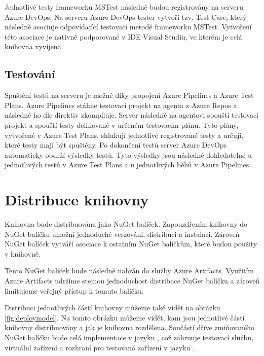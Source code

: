 Jednotlivé testy frameworku MSTest následně budou registrovány na serveru Azure DevOps. Na serveru Azure DevOps tester vytvoří tzv. Test Case, který následně asociuje odpovídající testovací metodě frameworku MSTest. Vytvoření této asociace je nativně podporované v IDE Visual Studiu, ve kterém je celá knihovna vyvíjena. 


\subsection{Testování}
Spuštění testů na serveru je možné díky propojení Azure Pipelines a Azure Test Plans. Azure Pipelines stáhne testovací projekt na agenta z Azure Repos a následně ho dle direktiv zkompiluje. Server následně na agentovi spouští testovací projekt a spouští testy definované v určeném testovacím plánu. Tyto plány, vytvořené v Azure Test Plans, shlukují jednotlivé registrované testy a určují, které testy mají být spuštěny. Po dokončení testů server Azure DevOps automaticky obdrží výsledky testů. Tyto výsledky jsou následně dohledatelné u jednotlivých testů v Azure Test Plans a u jednotlivých běhů v Azure Pipelines. 


\section{Distribuce knihovny}

Knihovna bude distribuována jako NuGet balíček. Zapouzdřením knihovny do NuGet balíčku umožní jednoduché verzování, distribuci a instalaci. Zároveň NuGet balíček vytváří asociace k ostatním NuGet balíčkům, které budou použity v knihovně.

Tento NuGet balíček bude následně nahrán do služby Azure Artifacts. Využitím Azure Artifacts udržíme stejnou jednoduchost distribuce NuGet balíčku a zároveň limitujeme veřejný přístup k tomuto balíčku. 

Distribuci jednotlivých částí knihovny můžeme také vidět na obrázku \ref{fig:deploymodel}. Na tomto obrázku můžeme vidět, kam jsou jednotlivé části knihovny distribuovány a jak je knihovna rozdělena. Součástí dříve zmiňovaného NuGet balíčku bude celá implementace v jazyku \csharp{}, což zahrnuje testovací službu, virtuální zařízení a rozhraní pro testovaná zařízení v jazyku \csharp{}. 

